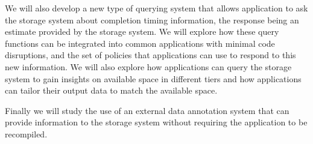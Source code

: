 We will also develop a new type of querying system that allows application
to ask the storage system about completion timing information, the response
being an estimate provided by the storage system. We will explore how these
query functions can be integrated into common applications with minimal code
disruptions, and the set of policies that applications can use to respond to
this new information. We will also explore how applications can query the
storage system to gain insights on available space in different tiers and
how applications can tailor their output data to match the available space. 

Finally we will study the use of an external data annotation system that can
provide information to the storage system without requiring the application
to be recompiled. 



